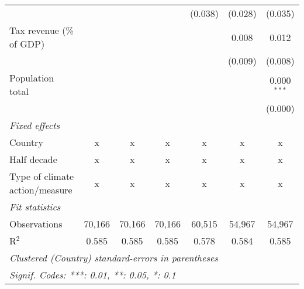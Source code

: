 \begin{tabular}{lcccccc}
                                                 &         &                &                & (0.038)        & (0.028)        & (0.035)\\   
   Tax revenue (\% of GDP)                       &         &                &                &                & 0.008          & 0.012\\   
                                                 &         &                &                &                & (0.009)        & (0.008)\\   
   Population total                              &         &                &                &                &                & 0.000$^{***}$\\   
                                                 &         &                &                &                &                & (0.000)\\   
   \emph{Fixed effects}\\
   Country                                       & x       & x              & x              & x              & x              & x\\  
   Half decade                                   & x       & x              & x              & x              & x              & x\\  
   Type of climate action/measure                & x       & x              & x              & x              & x              & x\\  
   \midrule \emph{Fit statistics}\\
   Observations                                  & 70,166  & 70,166         & 70,166         & 60,515         & 54,967         & 54,967\\  
   R$^2$                                         & 0.585   & 0.585          & 0.585          & 0.578          & 0.584          & 0.585\\  
   \midrule
   \multicolumn{7}{l}{\emph{Clustered (Country) standard-errors in parentheses}}\\
   \multicolumn{7}{l}{\emph{Signif. Codes: ***: 0.01, **: 0.05, *: 0.1}}\\
\end{tabular}
\par\endgroup


